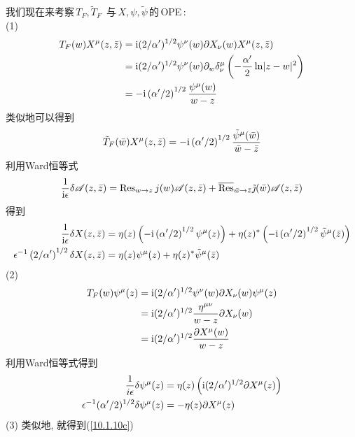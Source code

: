 \begin{tcolorbox}
\noindent 我们现在来考察$\,T_{F},\tilde{T}_{F}\,$%
与\,$X,\psi ,\tilde{\psi}\,$的\,OPE\,: \\
(1)
\begin{align*}
T_{F}(w)X^{\mu }(z,\bar{z}) &=\mathrm{i}(2/\alpha ^{\prime })^{1/2}\psi ^{\nu
}(w)\partial X_{\nu }(w)X^{\mu }(z,\bar{z}) \\
&=\mathrm{i}(2/\alpha ^{\prime })^{1/2}\psi ^{\nu }(w)\partial _{w}\delta _{\nu
}^{\mu }\left( -\frac{\alpha ^{\prime }}{2}\ln \lvert z-w\rvert
^{2}\right)  \\
&=-\mathrm{i}\left( \alpha ^{\prime }/2\right) ^{1/2}\frac{\psi ^{\mu }(w)}{w-z}
\end{align*}%
类似地可以得到\[
\tilde{T}_{F}(\bar{w})X^{\mu }(z,\bar{z})=-\mathrm{i}\left( \alpha ^{\prime
}/2\right) ^{1/2}\frac{\tilde{\psi}^{\mu }(\bar{w})}{\bar{w}-\bar{z}}
\]%
利用Ward恒等式\[
\frac{1}{\mi\epsilon }\delta \mathscr{A}(z,\bar{z})=\operatorname{Res}_{w\rightarrow z}j(w)\mathscr{A}(z,%
\bar{z})+\overline{\operatorname{Res}}_{\bar{w}\rightarrow \bar{z}}\tilde{\jmath}(\bar{w})\mathscr{A}(z,\bar{z}%
)
\]%
得到\begin{align*}
\frac{1}{\mi\epsilon }\delta X(z,\bar{z}) &=\eta (z)\left( -\mi\left( \alpha
^{\prime }/2\right) ^{1/2}\psi ^{\mu }(z)\right) +\eta (z)^{\ast }\left(
-\mi\left( \alpha ^{\prime }/2\right) ^{1/2}\tilde{\psi}^{\mu }(\bar{z}%
)\right)  \\
\epsilon ^{-1}\left( 2/\alpha ^{\prime }\right) ^{1/2}\delta X(z,\bar{z})
&=\eta (z)\psi ^{\mu }(z)+\eta (z)^{\ast }\tilde{\psi}^{\mu }(\bar{z})
\end{align*}%
(2)%
\begin{align*}
T_{F}(w)\psi ^{\mu }(z) &=\mathrm{i}(2/\alpha ^{\prime })^{1/2}\psi ^{\nu
}(w)\partial X_{\nu }(w)\psi ^{\mu }(z) \\
&=\mathrm{i}(2/\alpha ^{\prime })^{1/2}\frac{\eta ^{\mu \nu }}{w-z}\partial X_{\nu
}(w) \\
&=\mathrm{i}(2/\alpha ^{\prime })^{1/2}\frac{\partial X^{\mu }(w)}{w-z}
\end{align*}%
利用Ward恒等式得到\begin{align*}
\frac{1}{i\epsilon }\delta \psi ^{\mu }(z) &=\eta (z)\left( \mathrm{i}(2/\alpha
^{\prime })^{1/2}\partial X^{\mu }(z)\right)  \\
\epsilon ^{-1}(\alpha ^{\prime }/2)^{1/2}\delta \psi ^{\mu }(z) &=-\eta
(z)\partial X^{\mu }(z)
\end{align*}%
(3) 类似地, 就得到(\ref{10.1.10c})
\end{tcolorbox}

